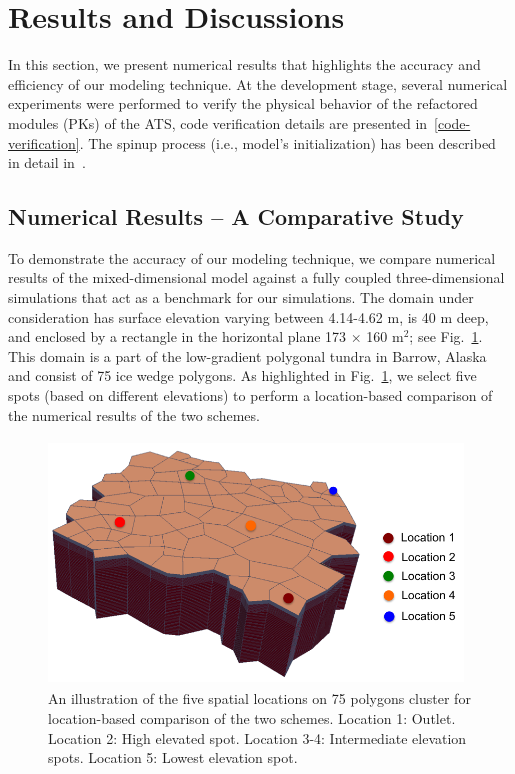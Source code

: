 \documentclass[review]{elsarticle}
\begin{document}
\section{Results and Discussions}\label{numerical-tests}

In this section, we present numerical results that highlights the accuracy and efficiency of our modeling technique. At the development stage, several numerical experiments were performed to verify the physical behavior of the refactored modules (PKs) of the ATS, code verification details are presented in~\ref{code-verification}. The spinup process (i.e., model's initialization) has been described in detail in~\cite{spainter2016integrated}. 


\subsection {Numerical Results -- A Comparative Study} 
To demonstrate the accuracy of our modeling technique, we compare numerical results of the mixed-dimensional model against a fully coupled three-dimensional simulations that act as a benchmark for our simulations. The domain under consideration has surface elevation varying between 4.14-4.62 m, is 40 m deep, and enclosed by a rectangle in the horizontal plane 173 $\times$ 160 m$^2$; see Fig.~\ref{surf-location}. This domain is a part of the low-gradient polygonal tundra in Barrow, Alaska and consist of 75 ice wedge polygons. As highlighted in Fig.~\ref{surf-location}, we select five spots (based on different elevations) to perform a location-based comparison of the numerical results of the two schemes. 
\begin{figure}[!htpb]
\centering
\includegraphics[height = 6.5cm, width=11cm]{figures/lobster75-3d.png}
\caption{An illustration of the five spatial locations on 75 polygons cluster for location-based comparison of the two schemes. Location 1: Outlet. Location 2: High elevated spot. Location 3-4: Intermediate elevation spots. Location 5: Lowest elevation spot.}
\label{surf-location}
\end{figure}
\end{document}
